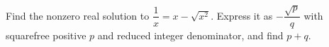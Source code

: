Find the nonzero real solution to $\dfrac{1}{x}=x-\sqrt{x^2}$. Express it as $-\dfrac{\sqrt p}{q}$ with squarefree positive $p$ and reduced integer denominator, and find $p+q$.
